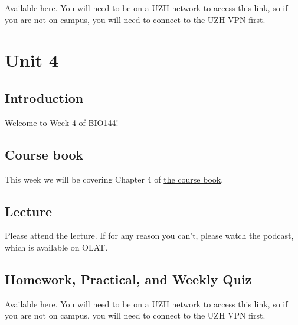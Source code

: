 \documentclass[
  letterpaper,
  8pt,
  a4paper]{book}
\begin{document}
Available
\href{https://rstudio.mnf.uzh.ch:3939/content/b448ba8b-4d13-4e69-83ed-4250a8bada0c}{here}.
You will need to be on a UZH network to access this link, so if you are
not on campus, you will need to connect to the UZH VPN first.


\chapter*{Unit 4}\label{unit-4}


\section*{Introduction}\label{introduction-4}


Welcome to Week 4 of BIO144!

\section*{Course book}\label{course-book-3}


This week we will be covering Chapter 4 of
\href{https://opetchey.github.io/BIO144_Course_Book/}{the course book}.

\section*{Lecture}\label{lecture-3}


Please attend the lecture. If for any reason you can't, please watch the
podcast, which is available on OLAT.

\section*{Homework, Practical, and Weekly
Quiz}\label{homework-practical-and-weekly-quiz-3}


Available
\href{https://rstudio.mnf.uzh.ch:3939/content/d6c3f6eb-c513-44c8-af74-d3db7f4d00a7}{here}.
You will need to be on a UZH network to access this link, so if you are
not on campus, you will need to connect to the UZH VPN first.
\end{document}
